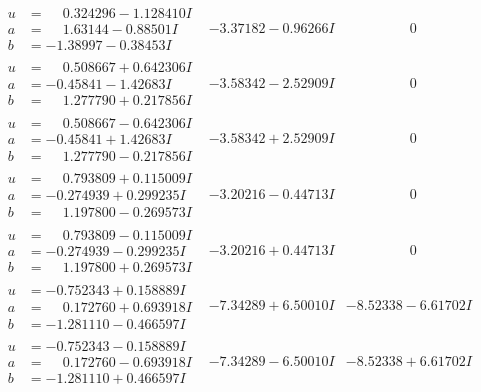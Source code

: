 \documentclass[1p]{elsarticle_modified}
\theoremstyle{definition}
\begin{document}
$$\begin{array}{c|c|c}
\begin{aligned}
u &= \phantom{-}0.324296 - 1.128410 I \\
a &= \phantom{-}1.63144 - 0.88501 I \\
b &= -1.38997 - 0.38453 I\end{aligned}
 & -3.37182 - 0.96266 I & \phantom{-0.000000 } 0 \\ \hline\begin{aligned}
u &= \phantom{-}0.508667 + 0.642306 I \\
a &= -0.45841 - 1.42683 I \\
b &= \phantom{-}1.277790 + 0.217856 I\end{aligned}
 & -3.58342 - 2.52909 I & \phantom{-0.000000 } 0 \\ \hline\begin{aligned}
u &= \phantom{-}0.508667 - 0.642306 I \\
a &= -0.45841 + 1.42683 I \\
b &= \phantom{-}1.277790 - 0.217856 I\end{aligned}
 & -3.58342 + 2.52909 I & \phantom{-0.000000 } 0 \\ \hline\begin{aligned}
u &= \phantom{-}0.793809 + 0.115009 I \\
a &= -0.274939 + 0.299235 I \\
b &= \phantom{-}1.197800 - 0.269573 I\end{aligned}
 & -3.20216 - 0.44713 I & \phantom{-0.000000 } 0 \\ \hline\begin{aligned}
u &= \phantom{-}0.793809 - 0.115009 I \\
a &= -0.274939 - 0.299235 I \\
b &= \phantom{-}1.197800 + 0.269573 I\end{aligned}
 & -3.20216 + 0.44713 I & \phantom{-0.000000 } 0 \\ \hline\begin{aligned}
u &= -0.752343 + 0.158889 I \\
a &= \phantom{-}0.172760 + 0.693918 I \\
b &= -1.281110 - 0.466597 I\end{aligned}
 & -7.34289 + 6.50010 I & -8.52338 - 6.61702 I \\ \hline\begin{aligned}
u &= -0.752343 - 0.158889 I \\
a &= \phantom{-}0.172760 - 0.693918 I \\
b &= -1.281110 + 0.466597 I\end{aligned}
 & -7.34289 - 6.50010 I & -8.52338 + 6.61702 I \\ \hline\begin{aligned}

\end{aligned}
\end{array}$$
\end{document}
